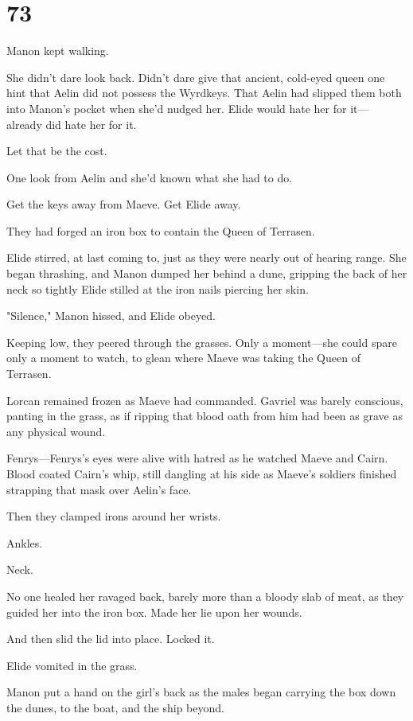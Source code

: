 
\chapter{73}

Manon kept walking.

She didn't dare look back. Didn't dare give that ancient, cold-eyed queen one hint that Aelin did not possess the Wyrdkeys. That Aelin had slipped them both into Manon's pocket when she'd nudged her. Elide would hate her for it--- already did hate her for it.

Let that be the cost.

One look from Aelin and she'd known what she had to do.

Get the keys away from Maeve. Get Elide away.

They had forged an iron box to contain the Queen of Terrasen.

Elide stirred, at last coming to, just as they were nearly out of hearing range. She began thrashing, and Manon dumped her behind a dune, gripping the back of her neck so tightly Elide stilled at the iron nails piercing her skin.

"Silence," Manon hissed, and Elide obeyed.

Keeping low, they peered through the grasses. Only a moment---she could spare only a moment to watch, to glean where Maeve was taking the Queen of Terrasen.

Lorcan remained frozen as Maeve had commanded. Gavriel was barely conscious, panting in the grass, as if ripping that blood oath from him had been as grave as any physical wound.

Fenrys---Fenrys's eyes were alive with hatred as he watched Maeve and Cairn. Blood coated Cairn's whip, still dangling at his side as Maeve's soldiers finished strapping that mask over Aelin's face.

Then they clamped irons around her wrists.

Ankles.

Neck.

No one healed her ravaged back, barely more than a bloody slab of meat, as they guided her into the iron box. Made her lie upon her wounds.

And then slid the lid into place. Locked it.

Elide vomited in the grass.

Manon put a hand on the girl's back as the males began carrying the box down the dunes, to the boat, and the ship beyond.

